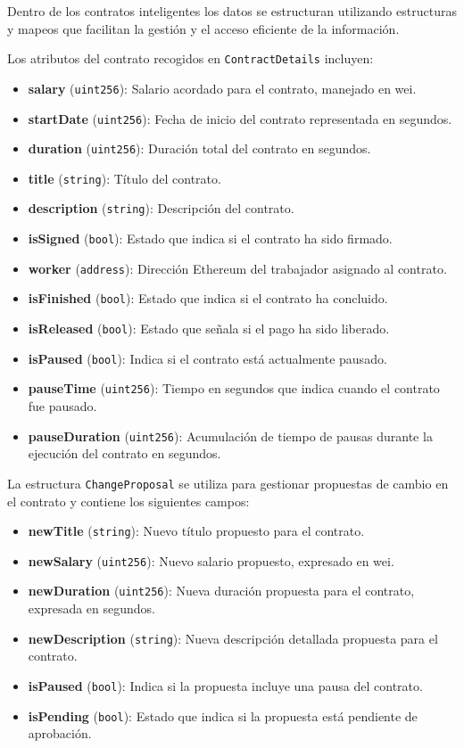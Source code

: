 Dentro de los contratos inteligentes los datos se estructuran utilizando estructuras y mapeos que facilitan la gestión y el acceso eficiente de la información. 

Los atributos del contrato recogidos en  \texttt{ContractDetails} incluyen:
\begin{itemize}
    \item \textbf{salary} (\texttt{uint256}): Salario acordado para el
 	 contrato, manejado en wei.
    \item \textbf{startDate} (\texttt{uint256}): Fecha de inicio del
     contrato representada en segundos.
    \item \textbf{duration} (\texttt{uint256}): Duración total del contrato
     en segundos.
    \item \textbf{title} (\texttt{string}): Título del contrato.
    \item \textbf{description} (\texttt{string}): Descripción del
     contrato.
    \item \textbf{isSigned} (\texttt{bool}): Estado que indica si el
     contrato ha sido firmado.
    \item \textbf{worker} (\texttt{address}): Dirección Ethereum del
     trabajador asignado al contrato.
    \item \textbf{isFinished} (\texttt{bool}): Estado que indica si el
     contrato ha concluido.
    \item \textbf{isReleased} (\texttt{bool}): Estado que señala si el pago
     ha sido liberado.
    \item \textbf{isPaused} (\texttt{bool}): Indica si el contrato está
     actualmente pausado.
    \item \textbf{pauseTime} (\texttt{uint256}): Tiempo en segundos que
     indica cuando el contrato fue pausado.
    \item \textbf{pauseDuration} (\texttt{uint256}): Acumulación de tiempo
     de pausas durante la ejecución del contrato en segundos.
\end{itemize}

La estructura \texttt{ChangeProposal} se utiliza para gestionar propuestas de cambio en el contrato y contiene los siguientes campos:
\begin{itemize}
    \item \textbf{newTitle} (\texttt{string}): Nuevo título propuesto para
     el contrato.
    \item \textbf{newSalary} (\texttt{uint256}): Nuevo salario propuesto,
     expresado en wei.
    \item \textbf{newDuration} (\texttt{uint256}): Nueva duración propuesta
     para el contrato, expresada en segundos.
    \item \textbf{newDescription} (\texttt{string}): Nueva descripción
     detallada propuesta para el contrato.
    \item \textbf{isPaused} (\texttt{bool}): Indica si la propuesta incluye
     una pausa del contrato.
    \item \textbf{isPending} (\texttt{bool}): Estado que indica si la
     propuesta está pendiente de aprobación.
\end{itemize}


